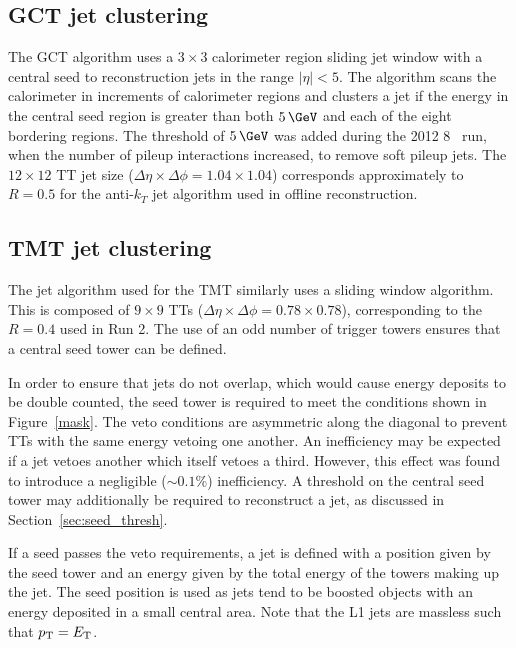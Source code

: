 \subsection{GCT jet clustering}
The GCT algorithm uses a $3\times3$ calorimeter region sliding jet window with a central seed 
to reconstruction jets in the range $|\eta| < 5$. The algorithm scans the calorimeter in increments
of calorimeter regions and clusters a jet if the energy in the central seed region is greater than 
both $5\,\GeV$ and each of the eight bordering regions. The threshold of $5\,\GeV$ was added during 
the 2012 8 \TeV~run, when the number of pileup interactions increased, to remove soft pileup jets.
The $12\times12$ TT jet size ($\Delta\eta\times\Delta\phi = 1.04\times1.04$) corresponds 
approximately to $R=0.5$ for the anti-$k_T$ jet algorithm used in offline reconstruction.

\subsection{TMT jet clustering}
The jet algorithm used for the TMT similarly uses a sliding window algorithm. This
is composed of $9\times9$ TTs ($\Delta\eta\times\Delta\phi = 0.78\times0.78$), corresponding 
to the $R=0.4$ used in Run 2. The use of an odd number of trigger towers ensures that a central 
seed tower can be defined. 

In order to ensure that jets do not overlap, which would cause energy deposits 
to be double counted, the seed tower is required to meet the conditions
shown in Figure~\ref{mask}. The veto conditions are asymmetric along the diagonal to prevent  
TTs with the same energy vetoing one another. An inefficiency may be expected 
if a jet vetoes another which itself vetoes a third. However, this effect was found to 
introduce a negligible ($\sim0.1\%$) inefficiency. A threshold on the central seed tower may 
additionally be required to reconstruct a jet, as discussed in Section~\ref{sec:seed_thresh}. 

If a seed passes the veto requirements, a jet is defined with a position 
given by the seed tower and an energy given by the total energy of the towers
making up the jet. The seed position is used as jets tend to be boosted
 objects with an energy deposited in a small central area. 
Note that the L1 jets are massless such that ${p_{\text T}} = {E_{\text T}}$.

